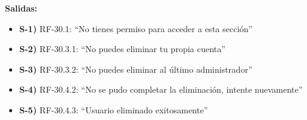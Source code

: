 \textbf{Salidas:}
\begin{itemize}[label={}, leftmargin=1.5em]
  \item \textbf{S-1)} RF-30.1: ``No tienes permiso para acceder a esta secci\'on''
  \item \textbf{S-2)} RF-30.3.1: ``No puedes eliminar tu propia cuenta''
  \item \textbf{S-3)} RF-30.3.2: ``No puedes eliminar al \'ultimo administrador''
  \item \textbf{S-4)} RF-30.4.2: ``No se pudo completar la eliminaci\'on, intente nuevamente''
  \item \textbf{S-5)} RF-30.4.3: ``Usuario eliminado exitosamente''
\end{itemize}
